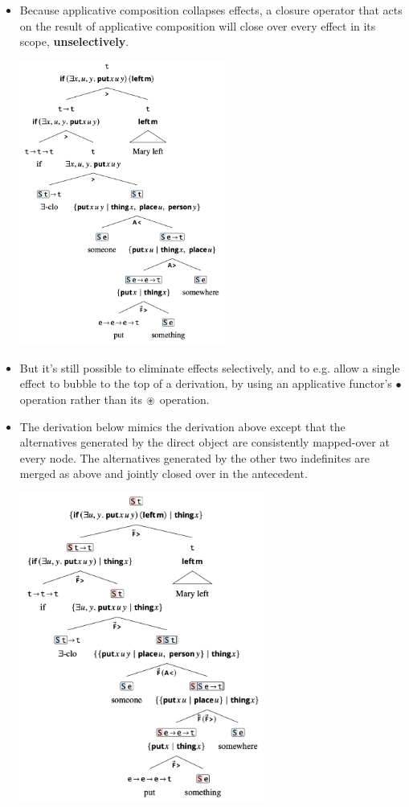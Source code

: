 \documentclass{article}
\begin{document}
\begin{itemize}
  \item Because applicative composition collapses effects, a closure operator that acts on the result of
    applicative composition will close over every effect in its scope, \textbf{unselectively}.
    \begin{exe}
      \ex \hfill \begin{center}
        \includegraphics[width=6.75cm]{clips/38.png}
      \end{center}
    \end{exe}
  \item But it's still possible to eliminate effects selectively, and to e.g. allow a single effect to 
    bubble to the top of a derivation, by using an applicative functor's $\bullet$ operation rather than its
    $\oast$ operation.
  \item The derivation below mimics the derivation above except that the alternatives generated by the direct object are consistently mapped-over at every node.
    The alternatives generated by the other two indefinites are merged as above and jointly closed over in the antecedent.
    \begin{exe}
      \ex \hfill \begin{center}
        \includegraphics[width=8cm]{clips/39.png}

\end{center}
\end{exe}
\end{itemize}
\end{document}
